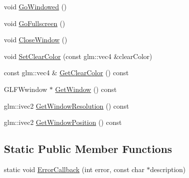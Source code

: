 \begin{DoxyCompactItemize}
void \mbox{\hyperlink{classec_1_1_window_a33339ac52b268b577d21dc9248e59935}{Go\+Windowed}} ()
\item 
void \mbox{\hyperlink{classec_1_1_window_af6345e0c05937b769936e714f154623e}{Go\+Fullscreen}} ()
\item 
void \mbox{\hyperlink{classec_1_1_window_a6605c513a7dbab0b43ddfad6ff7ac55a}{Close\+Window}} ()
\item 
void \mbox{\hyperlink{classec_1_1_window_af0d59d99e745ebde21fed3b165543a52}{Set\+Clear\+Color}} (const glm\+::vec4 \&clear\+Color)
\item 
const glm\+::vec4 \& \mbox{\hyperlink{classec_1_1_window_aa87fd9b3042657bc41461c1234296847}{Get\+Clear\+Color}} () const
\item 
G\+L\+F\+Wwindow $\ast$ \mbox{\hyperlink{classec_1_1_window_a3131064635c5c422ac65b17eeaddae59}{Get\+Window}} () const
\item 
glm\+::ivec2 \mbox{\hyperlink{classec_1_1_window_ab8dde6eac2f340b3a31cadf764f664f1}{Get\+Window\+Resolution}} () const
\item 
glm\+::ivec2 \mbox{\hyperlink{classec_1_1_window_a04959818ec9c89bb982deefa5868cab5}{Get\+Window\+Position}} () const
\end{DoxyCompactItemize}
\subsection*{Static Public Member Functions}
\begin{DoxyCompactItemize}
\item 
static void \mbox{\hyperlink{classec_1_1_window_ad8b192b0b757ec15d233d65e52dedc2c}{Error\+Callback}} (int error, const char $\ast$description)
\end{DoxyCompactItemize}
